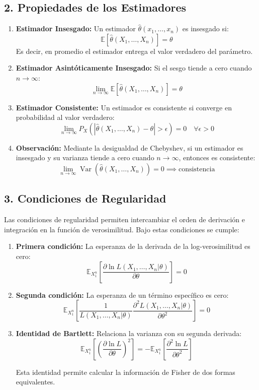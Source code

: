 \documentclass[
  11pt,
  letterpaper,
   addpoints,
   answers
  ]{exam}
\DeclareMathOperator{\Var}{Var} %
\begin{document}
\subsection*{2. Propiedades de los Estimadores}
\begin{enumerate}
  \item \textbf{Estimador Insesgado:} Un estimador $\hat{\theta}(x_1, \ldots, x_n)$ es insesgado si:
\[
\mathbb{E}[\hat{\theta}(X_1, \ldots, X_n)] = \theta
\]
Es decir, en promedio el estimador entrega el valor verdadero del parámetro.

\item \textbf{Estimador Asintóticamente Insesgado:} Si el sesgo tiende a cero cuando $n \to \infty$:
\[
\lim_{n\to\infty} \mathbb{E}[\hat{\theta}(X_1, \ldots, X_n)] = \theta
\]

\item \textbf{Estimador Consistente:} Un estimador es consistente si converge en probabilidad al valor verdadero:
\[
\lim_{n\to\infty} P_X(|\hat{\theta}(X_1, \ldots, X_n) - \theta| > \epsilon) = 0 \quad \forall \epsilon > 0
\]

\item \textbf{Observación:} Mediante la desigualdad de Chebyshev, si un estimador es insesgado y su varianza tiende a cero cuando $n \to \infty$, entonces es consistente:
\[
\lim_{n\to\infty} \Var(\hat{\theta}(X_1, \ldots, X_n)) = 0 \implies \text{consistencia}
\]
\end{enumerate}
\subsection*{3. Condiciones de Regularidad}

Las condiciones de regularidad permiten intercambiar el orden de derivación e integración en la función de verosimilitud. Bajo estas condiciones se cumple:
\begin{enumerate}
  \item \textbf{Primera condición:} La esperanza de la derivada de la log-verosimilitud es cero:
\[
\mathbb{E}_{X_1^n}\left[\frac{\partial \ln L(X_1, \ldots, X_n|\theta)}{\partial \theta}\right] = 0
\]

\item \textbf{Segunda condición:} La esperanza de un término específico es cero:
\[
\mathbb{E}_{X_1^n}\left[\frac{1}{L(X_1, \ldots, X_n|\theta)}\frac{\partial^2 L(X_1, \ldots, X_n|\theta)}{\partial \theta^2}\right] = 0
\]

\item \textbf{Identidad de Bartlett:} Relaciona la varianza con su segunda derivada:
\[
\mathbb{E}_{X_1^n}\left[\left(\frac{\partial \ln L}{\partial \theta}\right)^2\right] = -\mathbb{E}_{X_1^n}\left[\frac{\partial^2 \ln L}{\partial \theta^2}\right]
\]

Esta identidad permite calcular la información de Fisher de dos formas equivalentes.
\end{enumerate}
\end{document}
